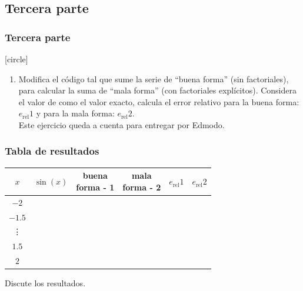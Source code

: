 \subsection{Tercera parte}
\begin{frame}[fragile]
\frametitle{Tercera parte}
[circle]
\begin{enumerate}[<+->]
\conti   
\item Modifica el código tal que sume la serie de \enquote{buena forma} (sin factoriales), para calcular la suma de \enquote{mala forma} (con factoriales explícitos). Considera el valor de  como el valor exacto, calcula el error relativo para la buena forma: $e_{\text{rel}}1$ y para la mala forma: $e_{\text{rel}}2$.
\\
\bigskip
Este ejercicio queda a cuenta para entregar por Edmodo.
\end{enumerate}
\end{frame}
\begin{frame}[fragile]
\frametitle{Tabla de resultados}
\fontsize{12}{12}\selectfont
\begin{table}
\begin{tabular}{| c | c | c | c | c | c |}
\hline
$x$ & $\sin (x)$ & \pbox{4cm}{buena \\ forma - 1} & \pbox{4cm}{mala \\ forma - 2} & $e_{\text{rel}}1$ & $e_{\text{rel}}2$\\ \hline
$-2$ & & & & & \\ \hline
$-1.5$ & & & & & \\ \hline
\vdots & & & & & \\ \hline
$1.5$ & & & & & \\ \hline
$2$ & & & & & \\ \hline
\end{tabular}
\end{table}
Discute los resultados.
\end{frame}
